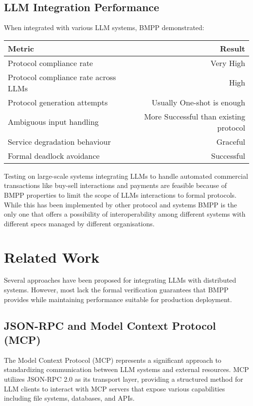 \documentclass[11pt,a4paper]{article}
\begin{document}
	\subsection{LLM Integration Performance}
	\label{subsec:llm-performance}
	
	When integrated with various LLM systems, BMPP demonstrated:
	\begin{center}
		\begin{tabular}{lr}
			\hline
			\textbf{Metric} & \textbf{Result} \\
			\hline
			Protocol compliance rate & Very High \\
			Protocol compliance rate across LLMs & High \\
			Protocol generation attempts & Usually One-shot is enough \\
			Ambiguous input handling & More Successful than existing protocol \\
			Service degradation behaviour & Graceful \\
			Formal deadlock avoidance & Successful \\
			\hline
		\end{tabular}
	\end{center}
	
	Testing on large-scale systems integrating LLMs to handle automated commercial transactions like buy-sell interactions and payments are feasible because of BMPP properties to limit the scope of LLMs interactions to formal protocols. While this has been implemented by other protocol and systems BMPP is the only one that offers a possibility of interoperability among different systems with different specs managed by different organisations. 
	
	\section{Related Work}
	\label{sec:related}
	
	Several approaches have been proposed for integrating LLMs with distributed systems. However, most lack the formal verification guarantees that BMPP provides while maintaining performance suitable for production deployment.
	
	\subsection{JSON-RPC and Model Context Protocol (MCP)}
	\label{subsec:json-rpc-mcp}
	
	The Model Context Protocol (MCP) represents a significant approach to standardizing communication between LLM systems and external resources. MCP utilizes JSON-RPC 2.0 as its transport layer, providing a structured method for LLM clients to interact with MCP servers that expose various capabilities including file systems, databases, and APIs.
	
\end{document}
